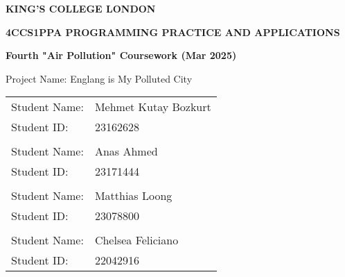 \begin{titlepage}
    \begin{center}
        \LARGE
        \textbf{KING'S COLLEGE LONDON}

        \vspace{2cm}

        \begin{adjustwidth}{-1cm}{-1cm}
            \centering
            \Large
            \textbf{4CCS1PPA PROGRAMMING PRACTICE AND APPLICATIONS}
        \end{adjustwidth}

        \vspace{0.5cm}

        \Large
        \textbf{Fourth "Air Pollution" Coursework (Mar 2025)}

        \vspace{2cm}

        \Large
        Project Name: Englang is My Polluted City

        \vspace{1cm}

        \Large
        \begin{tabular}{l l}
            Student Name: & Mehmet Kutay Bozkurt \\
            Student ID: & 23162628 \\
            \vspace{0.5cm} & \\
            Student Name: & Anas Ahmed \\
            Student ID: & 23171444 \\
            \vspace{0.5cm} & \\
            Student Name: & Matthias Loong \\
            Student ID: & 23078800 \\
            \vspace{0.5cm} & \\
            Student Name: & Chelsea Feliciano \\
            Student ID: & 22042916
        \end{tabular}
    \end{center}
\end{titlepage}